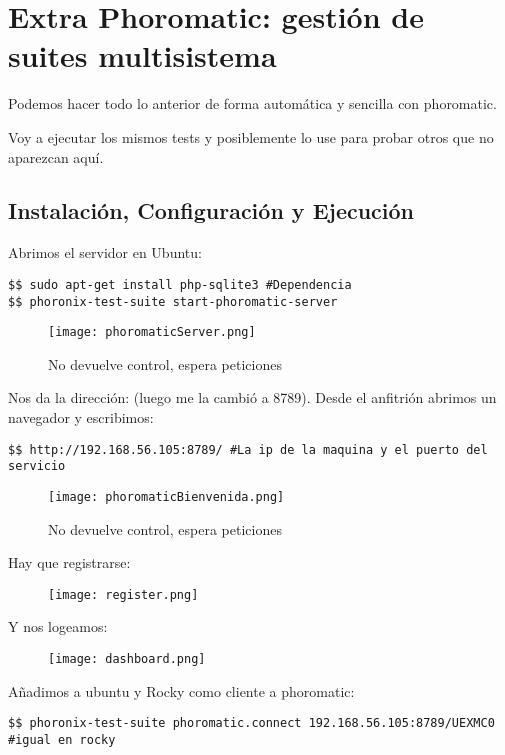 \section{Extra Phoromatic: gestión de suites multisistema}
Podemos hacer todo lo anterior de forma automática y sencilla con phoromatic.

Voy a ejecutar los mismos tests y posiblemente lo use para probar otros que no aparezcan aquí.

\subsection{Instalación, Configuración y Ejecución}
Abrimos el servidor en Ubuntu:
\begin{verbatim}
$$ sudo apt-get install php-sqlite3 #Dependencia
$$ phoronix-test-suite start-phoromatic-server
\end{verbatim}

\begin{figure}[H]
	\centering
	\texttt{[image: phoromaticServer.png]}
	\caption{No devuelve control, espera peticiones}
\end{figure}

Nos da la dirección:  (luego me la cambió a 8789). Desde el anfitrión abrimos un navegador y escribimos:
\begin{verbatim}
$$ http://192.168.56.105:8789/ #La ip de la maquina y el puerto del servicio
\end{verbatim}

\begin{figure}[H]
	\centering
	\texttt{[image: phoromaticBienvenida.png]}
	\caption{No devuelve control, espera peticiones}
\end{figure}

Hay que registrarse:

\begin{figure}[H]
	\centering
	\texttt{[image: register.png]}
	\caption{}
\end{figure}
Y nos logeamos:

\begin{figure}[H]
	\centering
	\texttt{[image: dashboard.png]}
\end{figure}

Añadimos a ubuntu y Rocky como cliente a phoromatic:

\begin{verbatim}
$$ phoronix-test-suite phoromatic.connect 192.168.56.105:8789/UEXMC0
#igual en rocky
\end{verbatim}

